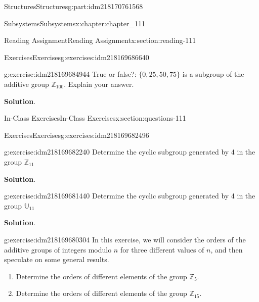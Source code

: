 \documentclass[oneside,10pt,]{book}
\newcommand{\blocktitlefont}{\relax}
\numberwithin{equation}{section}
\begin{document}
\begin{partptx}{Structures}{}{Structures}{}{}{g:part:idm218170761568}
\begin{chapterptx}{Subsystems}{}{Subsystems}{}{}{x:chapter:chapter_111}
\begin{sectionptx}{Reading Assignment}{}{Reading Assignment}{}{}{x:section:reading-111}
\begin{exercises-subsection-numberless}{Exercises}{}{Exercises}{}{}{g:exercises:idm218169686640}
\begin{exercisegroup}
\begin{divisionexerciseeg}{2}{}{}{g:exercise:idm218169684944}
True or false?: \(\{0,25,50,75\}\) is a subgroup of the additive group \(\mathbb{Z}_{100}\). Explain your answer.%
\par\smallskip%
\noindent\textbf{\blocktitlefont Solution}.\hypertarget{g:solution:idm218169683488}{}\quad{}%
\end{divisionexerciseeg}%
\end{exercisegroup}
\par\medskip\noindent
\end{exercises-subsection-numberless}
\end{sectionptx}
%
%
\typeout{************************************************}
\typeout{************************************************}
%
\begin{sectionptx}{In-Class Exercises}{}{In-Class Exercises}{}{}{x:section:questions-111}
%
%
%
\typeout{************************************************}
\typeout{************************************************}
%
\begin{exercises-subsection-numberless}{Exercises}{}{Exercises}{}{}{g:exercises:idm218169682496}
\par\medskip\noindent%
%
\begin{exercisegroup}
\begin{divisionexerciseeg}{1}{}{}{g:exercise:idm218169682240}%
Determine the cyclic subgroup generated by 4 in the group \(\mathbb{Z}_{11}\)%
\par\smallskip%
\noindent\textbf{\blocktitlefont Solution}.\hypertarget{g:solution:idm218169681152}{}\quad{}%
\end{divisionexerciseeg}%
\begin{divisionexerciseeg}{2}{}{}{g:exercise:idm218169681440}%
Determine the cyclic subgroup generated by 4 in the group \(\mathbb{U}_{11}\)%
\par\smallskip%
\noindent\textbf{\blocktitlefont Solution}.\hypertarget{g:solution:idm218169680016}{}\quad{}%
\end{divisionexerciseeg}%
\begin{divisionexerciseeg}{3}{}{}{g:exercise:idm218169680304}%
In this exercise, we will consider the orders of the additive groups of integers modulo \(n\) for three different values of \(n\), and then speculate on some general results.%
\begin{enumerate}[label=(\alph*)]
\item{}Determine the orders of different elements of the group \(\mathbb{Z}_{5}\).%
\item{}Determine the orders of different elements of the group \(\mathbb{Z}_{15}\).%

\end{enumerate}
\end{divisionexerciseeg}
\end{exercisegroup}
\end{exercises-subsection-numberless}
\end{sectionptx}
\end{chapterptx}
\end{partptx}
\end{document}
